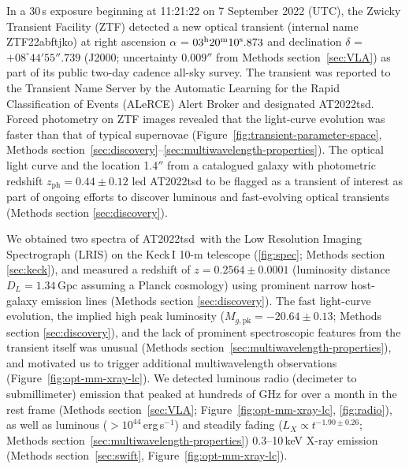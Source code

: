 \documentclass{nature_plusfigure}
\newcommand{\at}{AT2022tsd}
\begin{document}
In a 30\,s exposure beginning at 11:21:22 on 7 September 2022 (UTC), the Zwicky Transient Facility (ZTF\cite{Graham2019,Bellm2019}) detected a new optical transient (internal name ZTF22abftjko) at right ascension $\alpha$ = $03^{\rm{h}}20^{\rm{m}}10^{\rm{s}}.873$ and declination $\delta$ = $+08^{\circ} 44' 55''.739$ 
(J2000; uncertainty $0.009''$ from Methods section~\ref{sec:VLA}) as part of its public two-day cadence all-sky survey.
The transient was reported\cite{Munoz-Arancibia2022} to the Transient Name Server by the Automatic Learning for the Rapid Classification of Events (ALeRCE) Alert Broker\cite{Forster2021} and designated AT2022tsd.
Forced photometry on ZTF images\cite{Masci2019} revealed that the light-curve evolution was faster than that of typical supernovae (Figure~\ref{fig:transient-parameter-space}, Methods section~\ref{sec:discovery}--\ref{sec:multiwavelength-properties}).
The optical light curve and the location 1.4$''$ from a catalogued\cite{Beck2021} galaxy with photometric redshift $z_\mathrm{ph}=0.44\pm0.12$ led AT2022tsd to be flagged as a transient of interest as part of ongoing efforts to discover luminous and fast-evolving optical transients (Methods section \ref{sec:discovery}).

We obtained two spectra of \at\ with the Low Resolution Imaging Spectrograph (LRIS\cite{Oke1995}) on the Keck\,I 10-m telescope (\ref{fig:spec}; Methods section \ref{sec:keck}), and measured\cite{Ho2022_Astronote_Keck} a redshift of $z=0.2564\pm0.0001$ (luminosity distance $D_L=1.34\,$Gpc assuming a Planck cosmology\cite{Planck2020}) using prominent narrow host-galaxy emission lines (Methods section \ref{sec:discovery}). 
The fast light-curve evolution, the implied high peak luminosity ($M_{g,\mathrm{pk}}=-20.64\pm0.13$; Methods section \ref{sec:discovery}), and the lack of prominent spectroscopic features from the transient itself was unusual (Methods section~\ref{sec:multiwavelength-properties}), and motivated us to trigger additional multiwavelength observations (Figure~\ref{fig:opt-mm-xray-lc}).
We detected luminous radio (decimeter\cite{Ho2022Astronote_radio} to submillimeter) emission that peaked at hundreds of GHz for over a month in the rest frame (Methods section~\ref{sec:VLA}; Figure~\ref{fig:opt-mm-xray-lc}, \ref{fig:radio}),
as well as luminous ($>10^{44}\,$erg\,s$^{-1}$) and steadily fading ($L_X\propto t^{-1.90\pm0.26}$; Methods section~\ref{sec:multiwavelength-properties}) 0.3--10\,keV X-ray emission\cite{Schulze2022Astronote_xray} (Methods section~\ref{sec:swift}, Figure~\ref{fig:opt-mm-xray-lc}).
\end{document}
